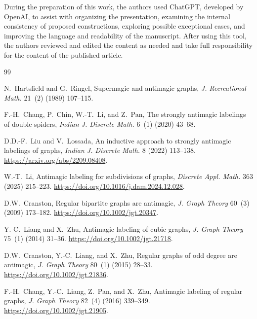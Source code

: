 \documentclass[preprint,12pt]{elsarticle}
\begin{document}
During the preparation of this work, the authors used ChatGPT, developed
by OpenAI, to assist with organizing the presentation, examining the
internal consistency of proposed constructions, exploring possible
exceptional cases, and improving the language and readability of the
manuscript. After using this tool, the authors reviewed and edited the
content as needed and take full responsibility for the content of the
published article.


\begin{thebibliography}{99}

N.~Hartsfield and G.~Ringel,
Supermagic and antimagic graphs,
\emph{J. Recreational Math.} 21~(2) (1989) 107--115.

F.-H.~Chang, P.~Chin, W.-T.~Li, and Z.~Pan,
The strongly antimagic labelings of double spiders,
\emph{Indian J. Discrete Math.} 6~(1) (2020) 43--68.

D.D.-F.~Liu and V.~Lossada,
An inductive approach to strongly antimagic labelings of graphs,
\emph{Indian J. Discrete Math.} 8 (2022) 113--138.
\newblock \url{https://arxiv.org/abs/2209.08408}.

W.-T.~Li,
Antimagic labeling for subdivisions of graphs,
\emph{Discrete Appl. Math.} 363 (2025) 215--223.
\newblock \url{https://doi.org/10.1016/j.dam.2024.12.028}.

D.W.~Cranston,
Regular bipartite graphs are antimagic,
\emph{J. Graph Theory} 60~(3) (2009) 173--182.
\newblock \url{https://doi.org/10.1002/jgt.20347}.

Y.-C.~Liang and X.~Zhu,
Antimagic labeling of cubic graphs,
\emph{J. Graph Theory} 75~(1) (2014) 31--36.
\newblock \url{https://doi.org/10.1002/jgt.21718}.

D.W.~Cranston, Y.-C.~Liang, and X.~Zhu,
Regular graphs of odd degree are antimagic,
\emph{J. Graph Theory} 80~(1) (2015) 28--33.
\newblock \url{https://doi.org/10.1002/jgt.21836}.

F.-H.~Chang, Y.-C.~Liang, Z.~Pan, and X.~Zhu,
Antimagic labeling of regular graphs,
\emph{J. Graph Theory} 82~(4) (2016) 339--349.
\newblock \url{https://doi.org/10.1002/jgt.21905}.


\end{thebibliography}
\end{document}
